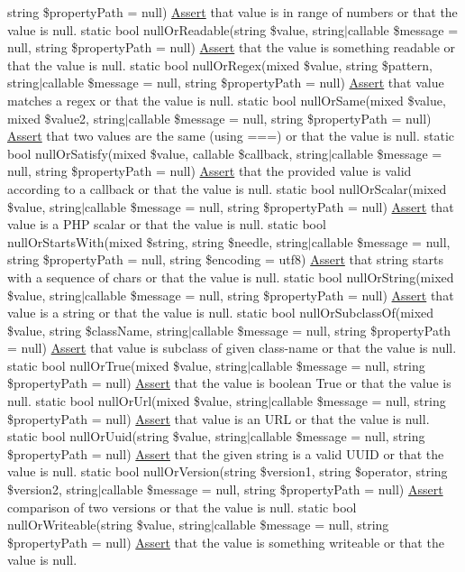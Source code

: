 string \$property\+Path = null) \mbox{\hyperlink{class_assert_1_1_assert}{Assert}} that value is in range of numbers or that the value is null.  static bool null\+Or\+Readable(string \$value, string$\vert$callable \$message = null, string \$property\+Path = null) \mbox{\hyperlink{class_assert_1_1_assert}{Assert}} that the value is something readable or that the value is null.  static bool null\+Or\+Regex(mixed \$value, string \$pattern, string$\vert$callable \$message = null, string \$property\+Path = null) \mbox{\hyperlink{class_assert_1_1_assert}{Assert}} that value matches a regex or that the value is null.  static bool null\+Or\+Same(mixed \$value, mixed \$value2, string$\vert$callable \$message = null, string \$property\+Path = null) \mbox{\hyperlink{class_assert_1_1_assert}{Assert}} that two values are the same (using ===) or that the value is null.  static bool null\+Or\+Satisfy(mixed \$value, callable \$callback, string$\vert$callable \$message = null, string \$property\+Path = null) \mbox{\hyperlink{class_assert_1_1_assert}{Assert}} that the provided value is valid according to a callback or that the value is null.  static bool null\+Or\+Scalar(mixed \$value, string$\vert$callable \$message = null, string \$property\+Path = null) \mbox{\hyperlink{class_assert_1_1_assert}{Assert}} that value is a P\+HP scalar or that the value is null.  static bool null\+Or\+Starts\+With(mixed \$string, string \$needle, string$\vert$callable \$message = null, string \$property\+Path = null, string \$encoding = \textquotesingle{}utf8\textquotesingle{}) \mbox{\hyperlink{class_assert_1_1_assert}{Assert}} that string starts with a sequence of chars or that the value is null.  static bool null\+Or\+String(mixed \$value, string$\vert$callable \$message = null, string \$property\+Path = null) \mbox{\hyperlink{class_assert_1_1_assert}{Assert}} that value is a string or that the value is null.  static bool null\+Or\+Subclass\+Of(mixed \$value, string \$class\+Name, string$\vert$callable \$message = null, string \$property\+Path = null) \mbox{\hyperlink{class_assert_1_1_assert}{Assert}} that value is subclass of given class-\/name or that the value is null.  static bool null\+Or\+True(mixed \$value, string$\vert$callable \$message = null, string \$property\+Path = null) \mbox{\hyperlink{class_assert_1_1_assert}{Assert}} that the value is boolean True or that the value is null.  static bool null\+Or\+Url(mixed \$value, string$\vert$callable \$message = null, string \$property\+Path = null) \mbox{\hyperlink{class_assert_1_1_assert}{Assert}} that value is an U\+RL or that the value is null.  static bool null\+Or\+Uuid(string \$value, string$\vert$callable \$message = null, string \$property\+Path = null) \mbox{\hyperlink{class_assert_1_1_assert}{Assert}} that the given string is a valid U\+U\+ID or that the value is null.  static bool null\+Or\+Version(string \$version1, string \$operator, string \$version2, string$\vert$callable \$message = null, string \$property\+Path = null) \mbox{\hyperlink{class_assert_1_1_assert}{Assert}} comparison of two versions or that the value is null.  static bool null\+Or\+Writeable(string \$value, string$\vert$callable \$message = null, string \$property\+Path = null) \mbox{\hyperlink{class_assert_1_1_assert}{Assert}} that the value is something writeable or that the value is null. 

